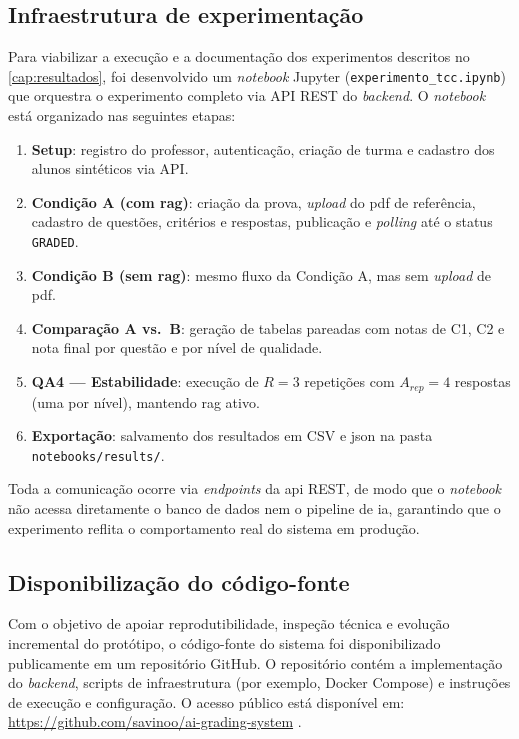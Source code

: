\subsection{Infraestrutura de experimentação}

Para viabilizar a execução e a documentação dos experimentos descritos no \autoref{cap:resultados}, foi desenvolvido um \textit{notebook} Jupyter (\texttt{experimento\_tcc.ipynb}) que orquestra o experimento completo via API REST do \textit{backend}. O \textit{notebook} está organizado nas seguintes etapas:

\begin{enumerate}
    \item \textbf{Setup}: registro do professor, autenticação, criação de turma e cadastro dos alunos sintéticos via API.
    \item \textbf{Condição A (com \gls{rag})}: criação da prova, \textit{upload} do \gls{pdf} de referência, cadastro de questões, critérios e respostas, publicação e \textit{polling} até o status \texttt{GRADED}.
    \item \textbf{Condição B (sem \gls{rag})}: mesmo fluxo da Condição A, mas sem \textit{upload} de \gls{pdf}.
    \item \textbf{Comparação A vs.\ B}: geração de tabelas pareadas com notas de C1, C2 e nota final por questão e por nível de qualidade.
    \item \textbf{QA4 --- Estabilidade}: execução de $R=3$ repetições com $A_{rep}=4$ respostas (uma por nível), mantendo \gls{rag} ativo.
    \item \textbf{Exportação}: salvamento dos resultados em CSV e \gls{json} na pasta \texttt{notebooks/\allowbreak results/}.
\end{enumerate}

Toda a comunicação ocorre via \textit{endpoints} da \gls{api} REST, de modo que o \textit{notebook} não acessa diretamente o banco de dados nem o pipeline de \gls{ia}, garantindo que o experimento reflita o comportamento real do sistema em produção.

\subsection{Disponibilização do código-fonte}

Com o objetivo de apoiar reprodutibilidade, inspeção técnica e evolução incremental do protótipo, o código-fonte do sistema foi disponibilizado publicamente em um repositório GitHub. O repositório contém a implementação do \textit{backend}, scripts de infraestrutura (por exemplo, Docker Compose) e instruções de execução e configuração. O acesso público está disponível em: \url{https://github.com/savinoo/ai-grading-system} \cite{ai_grading_system_repo_2026}.


